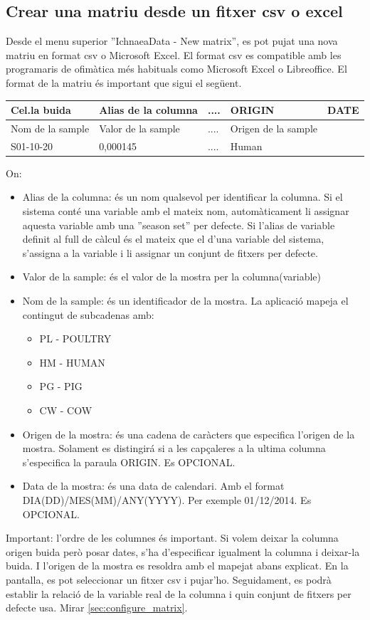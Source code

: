 \begin{itemize}
\subsection{Crear una matriu desde un fitxer csv o excel}
\label{sec:create_matrix}
Desde el menu superior ''IchnaeaData - New matrix'', es pot pujat una nova matriu en format csv o Microsoft Excel. El format csv es compatible amb les programaris de ofim\`{a}tica m\'{e}s habituals como Microsoft Excel o Libreoffice.
El format de la matriu \'{e}s important que sigui el següent.
\begin{center}
    \begin{tabular}{ | l | l | l | p{5cm} |}
    \hline
    Cel.la buida & Alias de la columna & .... & ORIGIN & DATE \\ \hline
    Nom de la sample & Valor de la sample  & .... & Origen de la sample \\ \hline
    S01-10-20        & 0,000145            & .... & Human \\ \hline
    \hline
    \end{tabular}
\end{center}
On:
\begin{itemize}
\item Alias de la columna: \'{e}s un nom qualsevol per identificar la columna. Si el sistema cont\'{e} una variable amb el mateix nom, autom\`{a}ticament li assignar aquesta variable amb una ''season set'' per defecte. Si l'alias de variable definit al full de c\`{a}lcul \'{e}s el mateix que el d'una variable del sistema, s'assigna a la variable i li assignar un conjunt de fitxers per defecte.
\item Valor de la sample: \'{e}s el valor de la mostra per la columna(variable)
\item Nom de la sample: \'{e}s un identificador de la mostra. La aplicaci\'{o} mapeja el contingut de subcadenas amb:
\begin{itemize}
\item PL - POULTRY
\item HM - HUMAN
\item PG - PIG
\item CW - COW
\end{itemize}
\item Origen de la mostra: \'{e}s una cadena de caràcters que especifica l'origen de la mostra. Solament es distingir\'{a} si a les capçaleres a la ultima columna s'especifica la paraula ORIGIN. Es OPCIONAL. 
\item Data de la mostra: \'{e}s una data de calendari. Amb el format DIA(DD)/MES(MM)/ANY(YYYY). Per exemple 01/12/2014. Es OPCIONAL. 
\end{itemize}
Important: l'ordre de les columnes \'{e}s important. Si volem deixar la columna origen buida però posar dates, s'ha d'especificar igualment la columna i deixar-la buida. I l'origen de la mostra es resoldra amb el mapejat abans explicat.
En la pantalla, es pot seleccionar un fitxer csv i pujar'ho. Seguidament, es podr\`{a} establir la relaci\'{o} de la variable real de la columna i quin conjunt de fitxers per defecte usa. Mirar \ref{sec:configure_matrix}.


\end{itemize}

